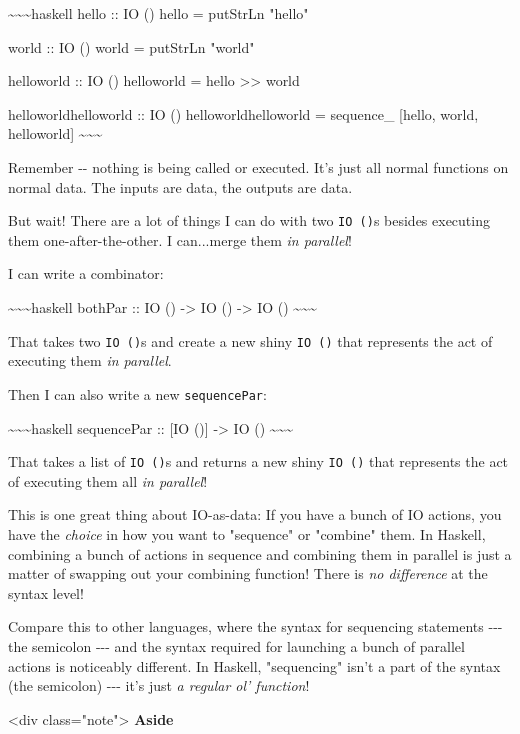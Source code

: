 \documentclass[]{article}
\begin{document}
\textasciitilde{}\textasciitilde{}\textasciitilde{}haskell hello :: IO () hello
= putStrLn "hello"

world :: IO () world = putStrLn "world"

helloworld :: IO () helloworld = hello \textgreater{}\textgreater{} world

helloworldhelloworld :: IO () helloworldhelloworld = sequence\_ {[}hello, world,
helloworld{]} \textasciitilde{}\textasciitilde{}\textasciitilde{}

Remember -\/- nothing is being called or executed. It's just all normal
functions on normal data. The inputs are data, the outputs are data.

But wait! There are a lot of things I can do with two \texttt{IO\ ()}s besides
executing them one-after-the-other. I can...merge them \emph{in parallel}!

I can write a combinator:

\textasciitilde{}\textasciitilde{}\textasciitilde{}haskell bothPar :: IO ()
-\textgreater{} IO () -\textgreater{} IO ()
\textasciitilde{}\textasciitilde{}\textasciitilde{}

That takes two \texttt{IO\ ()}s and create a new shiny \texttt{IO\ ()} that
represents the act of executing them \emph{in parallel}.

Then I can also write a new \texttt{sequencePar}:

\textasciitilde{}\textasciitilde{}\textasciitilde{}haskell sequencePar :: {[}IO
(){]} -\textgreater{} IO () \textasciitilde{}\textasciitilde{}\textasciitilde{}

That takes a list of \texttt{IO\ ()}s and returns a new shiny \texttt{IO\ ()}
that represents the act of executing them all \emph{in parallel}!

This is one great thing about IO-as-data: If you have a bunch of IO actions, you
have the \emph{choice} in how you want to "sequence" or "combine" them. In
Haskell, combining a bunch of actions in sequence and combining them in parallel
is just a matter of swapping out your combining function! There is \emph{no
difference} at the syntax level!

Compare this to other languages, where the syntax for sequencing statements
-\/-\/- the semicolon -\/-\/- and the syntax required for launching a bunch of
parallel actions is noticeably different. In Haskell, "sequencing" isn't a part
of the syntax (the semicolon) -\/-\/- it's just \emph{a regular ol' function}!

\textless{}div class="note"\textgreater{} \textbf{Aside}
\end{document}

